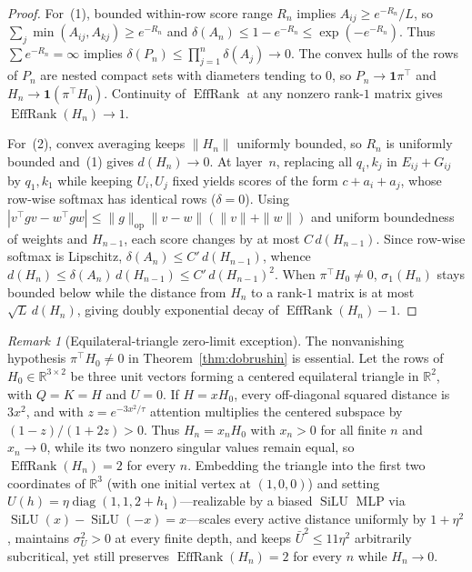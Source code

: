 \documentclass[11pt]{article}
\theoremstyle{plain}
\theoremstyle{definition}
\theoremstyle{remark}
\newtheorem{remark}{Remark}
\DeclareMathOperator{\EffRank}{EffRank}
\DeclareMathOperator{\diag}{diag}
\DeclareMathOperator{\SiLU}{SiLU}
\begin{document}
\begin{proof}
For~(1), bounded within-row score range $R_n$ implies $A_{ij} \ge e^{-R_n}/L$, so $\sum_j \min(A_{ij}, A_{kj}) \ge e^{-R_n}$ and $\delta(A_n) \le 1 - e^{-R_n} \le \exp(-e^{-R_n})$. Thus $\sum e^{-R_n} = \infty$ implies $\delta(P_n) \le \prod_{j=1}^n \delta(A_j) \to 0$. The convex hulls of the rows of $P_n$ are nested compact sets with diameters tending to $0$, so $P_n \to \mathbf{1}\pi^\top$ and $H_n \to \mathbf{1}(\pi^\top H_0)$. Continuity of $\EffRank$ at any nonzero rank-$1$ matrix gives $\EffRank(H_n) \to 1$.

For~(2), convex averaging keeps $\|H_n\|$ uniformly bounded, so $R_n$ is uniformly bounded and~(1) gives $d(H_n) \to 0$. At layer~$n$, replacing all $q_i, k_j$ in $E_{ij} + G_{ij}$ by $q_1, k_1$ while keeping $U_i, U_j$ fixed yields scores of the form $c + a_i + a_j$, whose row-wise softmax has identical rows ($\delta = 0$). Using $|v^\top g v - w^\top g w| \le \|g\|_{\mathrm{op}}\|v - w\|(\|v\| + \|w\|)$ and uniform boundedness of weights and $H_{n-1}$, each score changes by at most $C\,d(H_{n-1})$. Since row-wise softmax is Lipschitz, $\delta(A_n) \le C'\,d(H_{n-1})$, whence $d(H_n) \le \delta(A_n)\,d(H_{n-1}) \le C'\,d(H_{n-1})^2$. When $\pi^\top H_0 \neq 0$, $\sigma_1(H_n)$ stays bounded below while the distance from $H_n$ to a rank-$1$ matrix is at most $\sqrt{L}\,d(H_n)$, giving doubly exponential decay of $\EffRank(H_n) - 1$.
\end{proof}

\begin{remark}[Equilateral-triangle zero-limit exception]
The nonvanishing hypothesis $\pi^\top H_0 \neq 0$ in Theorem~\ref{thm:dobrushin} is essential. Let the rows of $H_0 \in \mathbb{R}^{3 \times 2}$ be three unit vectors forming a centered equilateral triangle in $\mathbb{R}^2$, with $Q = K = H$ and $U = 0$. If $H = x H_0$, every off-diagonal squared distance is $3x^2$, and with $z = e^{-3x^2/\tau}$ attention multiplies the centered subspace by $(1 - z)/(1 + 2z) > 0$. Thus $H_n = x_n H_0$ with $x_n > 0$ for all finite $n$ and $x_n \to 0$, while its two nonzero singular values remain equal, so $\EffRank(H_n) = 2$ for every $n$.
Embedding the triangle into the first two coordinates of $\mathbb{R}^3$ (with one initial vertex at $(1,0,0)$) and setting $U(h) = \eta\diag(1, 1, 2 + h_1)$---realizable by a biased $\SiLU$ MLP via $\SiLU(x) - \SiLU(-x) = x$---scales every active distance uniformly by $1 + \eta^2$, maintains $\sigma_U^2 > 0$ at every finite depth, and keeps $\bar U^2 \le 11\eta^2$ arbitrarily subcritical, yet still preserves $\EffRank(H_n) = 2$ for every $n$ while $H_n \to 0$.
\end{remark}
\end{document}
